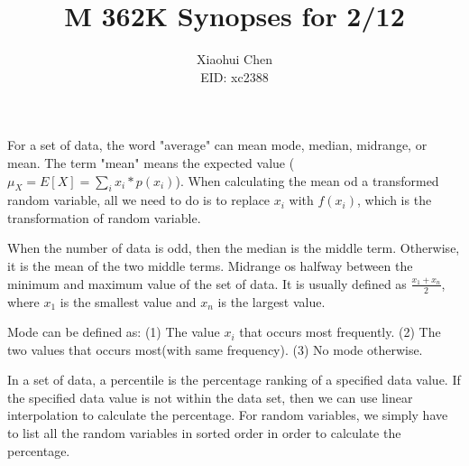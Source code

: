 \documentclass[12pt]{article}
\author{Xiaohui Chen \\EID: xc2388}
\title{M 362K Synopses for 2/12}
\begin{document}
\maketitle
\begin{spacing}{2.0}

For a set of data, the word "average" can mean mode, median, midrange, or mean. The term "mean" means the expected value ($\mu_X= E[X]= \sum_i x_i*p(x_i)$). When calculating the mean od a transformed random variable, all we need to do is to replace $x_i$ with $f(x_i)$, which is the transformation of random variable.

When the number of data is odd, then the median is the middle term. Otherwise, it is the mean of the two middle terms. Midrange os halfway between the minimum and maximum value of the set of data. It is usually defined as $\frac{x_1+x_n}{2}$, where $x_1$ is the smallest value and $x_n$ is the largest value.

Mode can be defined as: (1) The value $x_i$ that occurs most frequently. (2) The two values that occurs most(with same frequency). (3) No mode otherwise.

In a set of data, a percentile is the percentage ranking of a specified data value. If the specified data value is not within the data set, then we can use linear interpolation to calculate the percentage. For random variables, we simply have to list all the random variables in sorted order in order to calculate the percentage.


\end{spacing}
\end{document}
